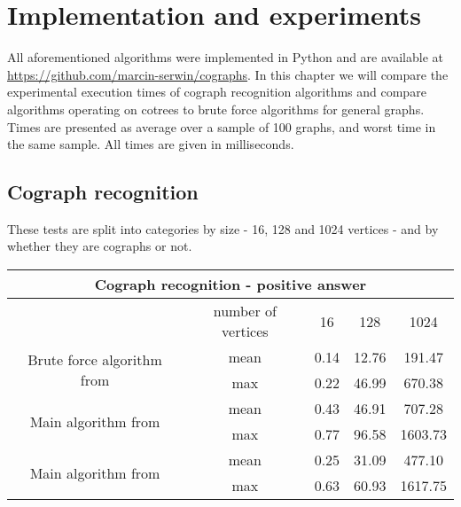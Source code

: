 \chapter{Implementation and experiments}

All aforementioned algorithms were implemented in Python and are available at \url{https://github.com/marcin-serwin/cographs}. In this chapter we will compare the experimental execution times of cograph recognition algorithms and compare algorithms operating on cotrees to brute force algorithms for general graphs. Times are presented as average over a sample of 100 graphs, and worst time in the same sample. All times are given in milliseconds.

\section{Cograph recognition}
These tests are split into categories by size - 16, 128 and 1024 vertices - and by whether they are cographs or not.

\begin{center}

    \begin{tabular}{ |c|c|c|c|c|}
        \hline
        \multicolumn{5}{|c|}{Cograph recognition - positive answer}                                            \\
        \hline
                                                                 & number of vertices & 16   & 128   & 1024    \\
        \hline
        \multirow{2}{*}{Brute force algorithm from \cite{habib}} & mean               & 0.14 & 12.76 & 191.47  \\
                                                                 & max                & 0.22 & 46.99 & 670.38  \\
        \hline
        \multirow{2}{*}{Main algorithm from \cite{habib}}        & mean               & 0.43 & 46.91 & 707.28  \\
                                                                 & max                & 0.77 & 96.58 & 1603.73 \\
        \hline
        \multirow{2}{*}{Main algorithm from \cite{corneil}}      & mean               & 0.25 & 31.09 & 477.10  \\
                                                                 & max                & 0.63 & 60.93 & 1617.75 \\
        \hline
    \end{tabular}
\end{center}

